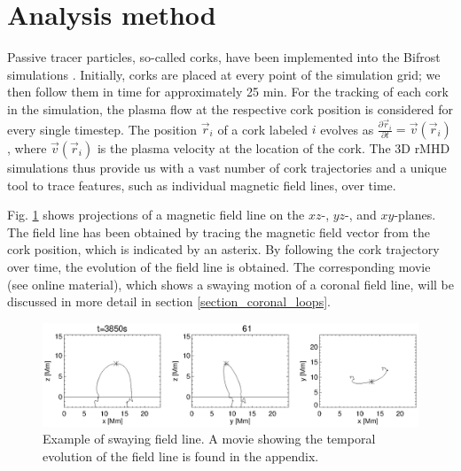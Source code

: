 \documentclass{aa}
\begin{document}
\section{Analysis method}\label{analysis_section}\label{section_VAPOR}
Passive tracer particles, so-called corks, have been implemented into the Bifrost simulations \citep{zacharias+al:2018}. Initially, corks are placed at every point of the simulation grid; we then follow them in time for approximately 25 min. For the tracking of each cork in the simulation, the plasma flow at the respective cork position is considered for every single timestep. The position ${\vec{r}}_i$ of a cork labeled $i$ evolves as $\frac{\partial {\vec{r}}_i}{\partial t}= \vec{v}(\vec{r}_i)$, where $\vec{v}(\vec{r}_i)$ is the plasma velocity at the location of the cork. 
The 3D rMHD simulations thus provide us with a vast number of cork trajectories and a unique tool to trace features, such as individual magnetic field lines, over time. 

Fig. \ref{swaying_fieldline} shows projections of a magnetic field line on the $xz$-, $yz$-, and $xy$-planes. The field line has been obtained by tracing the magnetic field vector from the cork position, which is indicated by an asterix. By following the cork trajectory over time, the evolution of the field line is obtained. The corresponding movie (see online material), which shows a swaying motion of a coronal field line, will be discussed in more detail in section \ref{section_coronal_loops}. \\

\begin{figure}[!h]
\begin{center}
\includegraphics[width=\textwidth]{figures2/xz_yz_xy_line61_385.eps}
\end{center}
\caption{Example of swaying field line. A movie showing the temporal evolution of the field line is found in the appendix. \label{swaying_fieldline}}
\end{figure}
\end{document}
